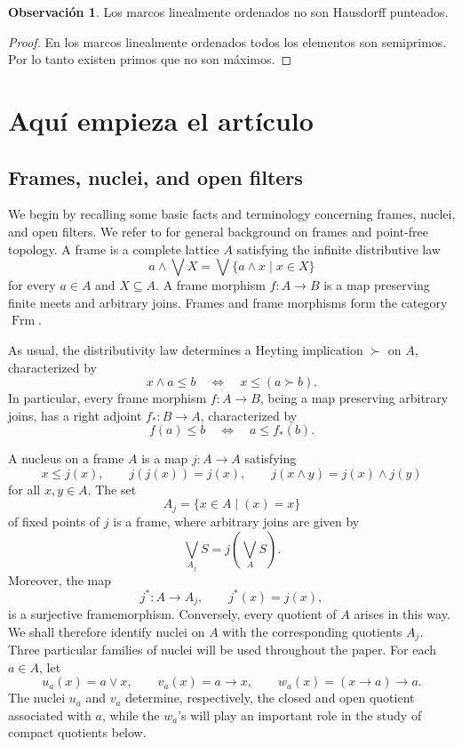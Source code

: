 \documentclass[11pt]{amsart}
\DeclareMathOperator{\Frm}{Frm}
\theoremstyle{plain}
\theoremstyle{definition}
\newtheorem{obs}[thm]{Observación}
\begin{document}
\begin{obs}
    Los marcos linealmente ordenados no son Hausdorff punteados. 
\end{obs}

\begin{proof}
    En los marcos linealmente ordenados todos los elementos son semiprimos. Por lo tanto existen primos que no son máximos.
\end{proof}



\section{Aquí empieza el artículo}

\subsection{Frames, nuclei, and open filters}
We begin by recalling some basic facts and terminology concerning frames, nuclei, and open filters. We refer to \cite{Johnstone82,PicadoPultr,simmonscollection,simmons2006assembly} for general background on frames and point-free topology.
A frame is a complete lattice \(A\) satisfying the infinite distributive law
\[a\wedge\bigvee X=\bigvee\{a\wedge x\mid x\in X\}\]
for every \(a\in A\) and \(X\subseteq A\). A frame morphism \(f\colon A\to B\) is a map preserving finite meets and arbitrary joins. Frames and frame morphisms form the category \(\Frm\).

As usual, the distributivity law determines a Heyting implication \(\succ\) on \(A\), characterized by
\[
x\wedge a\leq b\quad\Longleftrightarrow\quad x\leq(a\succ b).
\]
In particular, every frame morphism \(f\colon A\to B\), being a map preserving arbitrary joins, has a right adjoint \(f_*\colon B\to A\), characterized by
\[
f(a)\leq b\quad\Longleftrightarrow\quad a\leq f_*(b).
\]

A nucleus on a frame \(A\) is a map \(j\colon A\to A\) satisfying
\[
x\leq j(x),\qquad j(j(x))=j(x),\qquad
j(x\wedge y)=j(x)\wedge j(y)
\]
for all \(x,y\in A\). The set
\[
A_j=\{x\in A\mid (x)=x\}
\]
of fixed points of \(j\) is a frame, where arbitrary joins are given by
\[
\bigvee_{A_j}S=j\left(\bigvee_A S\right).
\]
Moreover, the map
\[
j^*\colon A\longrightarrow A_j,\qquad j^*(x)=j(x),
\]
is a surjective framemorphism. Conversely, every quotient of \(A\) arises in this way. We shall therefore identify nuclei on \(A\) with the corresponding quotients \(A_j\).
Three particular families of nuclei will be used throughout the paper. For each \(a\in A\), let
\[
u_a(x)=a\vee x,\qquad
v_a(x)=a\to x,\qquad
w_a(x)=(x\to a)\to a.
\]
The nuclei \(u_a\) and \(v_a\) determine, respectively, the closed and open quotient associated with \(a\), while the \(w_a\)'s will play an important role in the study of compact quotients below.
\end{document}
